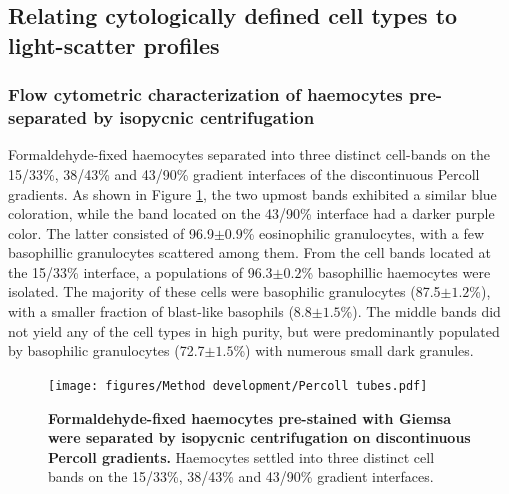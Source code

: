 \subsection{Relating cytologically defined cell types to light-scatter profiles}
\subsubsection{Flow cytometric characterization of haemocytes pre-separated by isopycnic centrifugation }
Formaldehyde-fixed haemocytes separated into three distinct cell-bands on the 15/33\%, 38/43\% and 43/90\% gradient interfaces of the discontinuous Percoll gradients. As shown in Figure \ref{fig:Percoll-tubes}, the two upmost bands exhibited a similar blue coloration, while the band located on the 43/90\% interface had a darker purple color. The latter consisted of 96.9$\pm{0.9}$\% eosinophilic granulocytes, with a few basophillic granulocytes scattered among them. From the cell bands located at the 15/33\% interface, a populations of 96.3$\pm{0.2}$\% basophillic haemocytes were isolated. The majority of these cells were basophilic granulocytes (87.5$\pm{1.2}$\%), with a smaller fraction of blast-like basophils (8.8$\pm{1.5}$\%). The middle bands did not yield any of the cell types in high purity, but were predominantly populated by basophilic granulocytes (72.7$\pm{1.5}$\%) with numerous small dark granules.

\begin{figure}[!ht]
    \centering
    \texttt{[image: figures/Method development/Percoll tubes.pdf]}
    \caption{\textbf{Formaldehyde-fixed haemocytes pre-stained with Giemsa were separated by isopycnic centrifugation on discontinuous Percoll gradients.} Haemocytes settled into three distinct cell bands on the 15/33\%, 38/43\% and 43/90\% gradient interfaces.}
    \label{fig:Percoll-tubes}
\end{figure}

